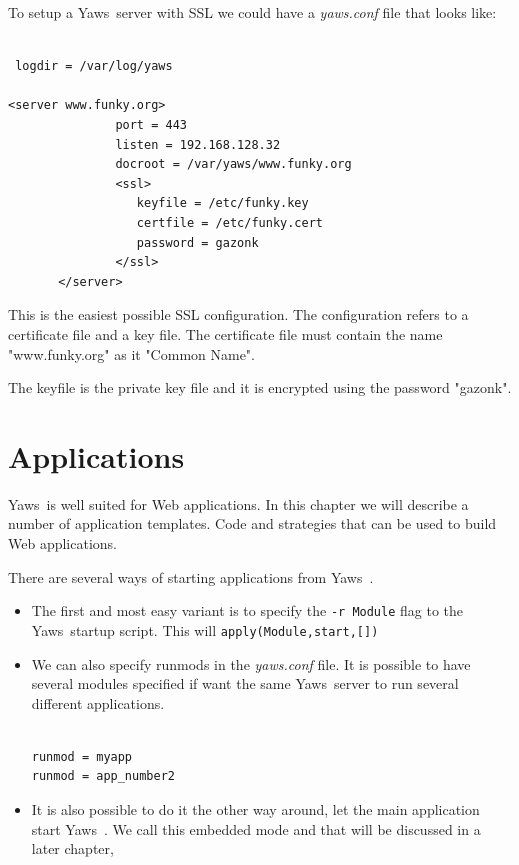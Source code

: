 \documentclass[11pt,oneside,english]{book}
\newcommand{\Yaws}            %
        {{\sc Yaws}}
\begin{document}
To setup a \Yaws\  server with SSL we could have a \textit{yaws.conf} file that
looks like:

\begin{verbatim}

 logdir = /var/log/yaws

<server www.funky.org>
               port = 443
               listen = 192.168.128.32
               docroot = /var/yaws/www.funky.org
               <ssl>
                  keyfile = /etc/funky.key
                  certfile = /etc/funky.cert
                  password = gazonk
               </ssl>
       </server>
\end{verbatim}

This is the easiest possible SSL configuration. The configuration
refers to a certificate file and a key file. The certificate file
must contain the name "www.funky.org" as it "Common Name".

The keyfile is the private key file and it is encrypted using
the password "gazonk".






\chapter{Applications}

\Yaws\  is well suited for Web applications. In this chapter we will
describe a number of application templates. Code and strategies that
can be used to build Web applications.

There are several ways of starting applications from
\Yaws\  .

\begin{itemize}
\item The first and most easy variant is to specify
the \verb+-r Module+ flag to the \Yaws\  startup script.
This will \verb+apply(Module,start,[])+

\item We can also specify runmods in the \textit{yaws.conf} file.
It is possible to have several modules specified if want
the same \Yaws\  server to run several different applications.

\begin{verbatim}

runmod = myapp
runmod = app_number2

\end{verbatim}

\item It is also possible to do it the other way around, let
the main application start \Yaws\ . We call this embedded mode
and that will be discussed in a later chapter,

\end{itemize}
\end{document}
